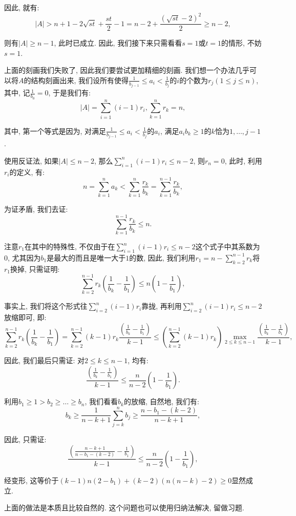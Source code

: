 \documentclass[lang=cn,12pt,thmcnt=section]{elegantbook}
\begin{document}
\begin{analysis}
因此, 就有: 
\[
|A|>n+1-2\sqrt{st}+\frac{st}{2}-1=n-2+\frac{(\sqrt{st}-2)^2}{2}\ge n-2,
\]

则有$|A|\ge n-1$, 此时已成立. 因此, 我们接下来只需看看$s=1$或$t=1$的情形, 不妨$s=1$. 

上面的刻画我们失败了, 因此我们要尝试更加精细的刻画. 我们想一个办法几乎可以将$A$的结构刻画出来, 我们设所有使得$\frac{1}{b_{j-1}}\le  a_i<\frac{1}{b_{j}}$的$i$的个数为$r_j(1\le j\le n)$, 其中, 记$\frac{1}{b_0}=0$, 于是我们有: 
\[
|A|=\sum_{i=1}^n (i-1)r_i, \sum_{k=1}^n r_k=n,
\]

其中, 第一个等式是因为, 对满足$\frac{1}{b_{j-1}}\le  a_i<\frac{1}{b_{j}}$的$a_i$, 满足$a_ib_k\ge 1$的$k$恰为$1,\dots{},j-1$.

使用反证法, 如果$|A|\le n-2$, 那么$\sum\limits_{i=1}^n (i-1)r_i\le n-2$, 则$r_n=0$, 此时, 利用$r_i$的定义, 有: 
\[
n=\sum_{k=1}^n a_k< \sum_{k=1}^n \frac{r_k}{b_k}=\sum_{k=1}^{n-1}\frac{r_k}{b_k}, 
\]

为证矛盾, 我们去证: 
\[
\sum_{k=1}^{n-1}\frac{r_k}{b_k}\le n.
\]

注意$r_1$在其中的特殊性, 不仅由于在$\sum\limits_{i=1}^n (i-1)r_i\le n-2$这个式子中其系数为$0$, 尤其因为$b_1$是最大的而且是唯一大于$1$的数, 因此, 我们利用$r_1=n-\sum\limits_{k=2}^{n-1}r_k$将$r_1$换掉, 只需证明: 
\[
\sum_{k=2}^{n-1}r_k\left(\frac{1}{b_k}-\frac{1}{b_1}\right)\le n\left(1-\frac{1}{b_1}\right),
\]

事实上, 我们将这个形式往$\sum_{i=2}^n (i-1)r_i$靠拢, 再利用$\sum\limits_{i=2}^n (i-1)r_i\le n-2$放缩即可, 即: 
\[
\sum_{k=2}^{n-1}r_k\left(\frac{1}{b_k}-\frac{1}{b_1}\right)=\sum_{k=2}^{n-1}(k-1)r_k\frac{\left(\frac{1}{b_k}-\frac{1}{b_1}\right)}{k-1}\le \left(\sum_{k=2}^{n-1}(k-1)r_k\right)\max_{2\le k\le n-1}{\frac{\left(\frac{1}{b_k}-\frac{1}{b_1}\right)}{k-1}},
\]

因此, 我们最后只需证: 对$2\le k\le n-1$, 均有: 
\[
\frac{\left(\frac{1}{b_k}-\frac{1}{b_1}\right)}{k-1}\le \frac{n}{n-2}\left(1-\frac{1}{b_1}\right).
\]

利用$b_1\ge 1>b_2\ge \dots{}\ge b_n$, 我们看看$b_k$的放缩, 自然地, 我们有: 
\[
b_k\ge \frac{1}{n-k+1}\sum_{j=k}^n b_j\ge \frac{n-b_1-(k-2)}{n-k+1}, 
\]

因此, 只需证: 
\[
\frac{\left(\frac{n-k+1}{n-b_1-(k-2)}-\frac{1}{b_1}\right)}{k-1}\le \frac{n}{n-2}\left(1-\frac{1}{b_1}\right),
\]

经变形, 这等价于$(k-1)n(2-b_1)+(k-2)(n(n-k)-2)\ge 0$显然成立.

上面的做法是本质且比较自然的. 这个问题也可以使用归纳法解决, 留做习题.
\end{analysis}
\end{document}
